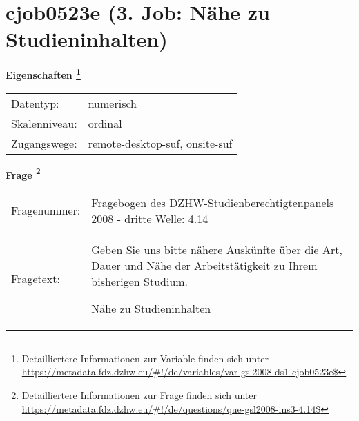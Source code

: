 
    \setcounter{footnote}{0}

    \vspace*{-1.8cm}
	\section{cjob0523e (3. Job: Nähe zu Studieninhalten)}
	\label{section:cjob0523e}



    \vspace*{0.5cm}
    \noindent\textbf{Eigenschaften
	\footnote{Detailliertere Informationen zur Variable finden sich unter
		\url{https://metadata.fdz.dzhw.eu/\#!/de/variables/var-gsl2008-ds1-cjob0523e$}}}\\
	\begin{tabularx}{\hsize}{@{}lX}
	Datentyp: & numerisch \\
	Skalenniveau: & ordinal \\
	Zugangswege: &
	  remote-desktop-suf, 
	  onsite-suf
 \\
    \end{tabularx}



				\vspace*{0.5cm}
                \noindent\textbf{Frage
	                \footnote{Detailliertere Informationen zur Frage finden sich unter
		              \url{https://metadata.fdz.dzhw.eu/\#!/de/questions/que-gsl2008-ins3-4.14$}}}\\
				\begin{tabularx}{\hsize}{@{}lX}
					Fragenummer: &
					  Fragebogen des DZHW-Studienberechtigtenpanels 2008 - dritte Welle:
					  4.14
 \\
					Fragetext: & Geben Sie uns bitte nähere Auskünfte über die Art, Dauer und Nähe der Arbeitstätigkeit zu Ihrem bisherigen Studium.\par  Nähe zu Studieninhalten \\
				\end{tabularx}





